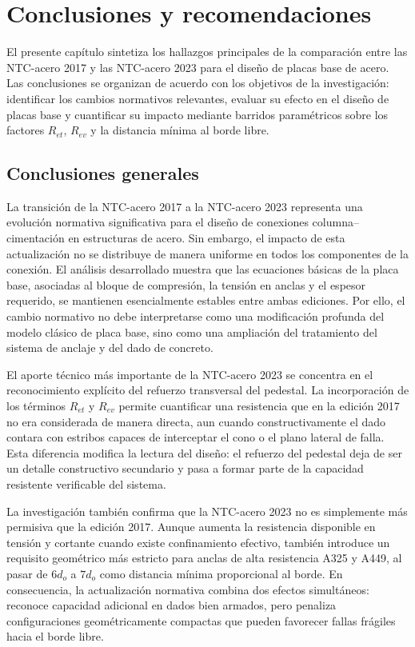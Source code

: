 \chapter{Conclusiones y recomendaciones}

El presente capítulo sintetiza los hallazgos principales de la comparación entre las NTC-acero 2017
y las NTC-acero 2023 para el diseño de placas base de acero. Las conclusiones se organizan de
acuerdo con los objetivos de la investigación: identificar los cambios normativos relevantes,
evaluar su efecto en el diseño de placas base y cuantificar su impacto mediante barridos
paramétricos sobre los factores $R_{et}$, $R_{ev}$ y la distancia mínima al borde libre.

\section{Conclusiones generales}

La transición de la NTC-acero 2017 a la NTC-acero 2023 representa una evolución normativa
significativa para el diseño de conexiones columna--cimentación en estructuras de acero. Sin
embargo, el impacto de esta actualización no se distribuye de manera uniforme en todos los
componentes de la conexión. El análisis desarrollado muestra que las ecuaciones básicas de la placa
base, asociadas al bloque de compresión, la tensión en anclas y el espesor requerido, se mantienen
esencialmente estables entre ambas ediciones. Por ello, el cambio normativo no debe interpretarse
como una modificación profunda del modelo clásico de placa base, sino como una ampliación del
tratamiento del sistema de anclaje y del dado de concreto.

El aporte técnico más importante de la NTC-acero 2023 se concentra en el reconocimiento explícito del
refuerzo transversal del pedestal. La incorporación de los términos $R_{et}$ y $R_{ev}$ permite
cuantificar una resistencia que en la edición 2017 no era considerada de manera directa, aun cuando
constructivamente el dado contara con estribos capaces de interceptar el cono o el plano lateral de
falla. Esta diferencia modifica la lectura del diseño: el refuerzo del pedestal deja de ser un
detalle constructivo secundario y pasa a formar parte de la capacidad resistente verificable del
sistema.

La investigación también confirma que la NTC-acero 2023 no es simplemente más permisiva que la
edición 2017. Aunque aumenta la resistencia disponible en tensión y cortante cuando existe
confinamiento efectivo, también introduce un requisito geométrico más estricto para anclas de alta
resistencia A325 y A449, al pasar de $6d_o$ a $7d_o$ como distancia mínima proporcional al borde. En
consecuencia, la actualización normativa combina dos efectos simultáneos: reconoce capacidad
adicional en dados bien armados, pero penaliza configuraciones geométricamente compactas que pueden
favorecer fallas frágiles hacia el borde libre.

